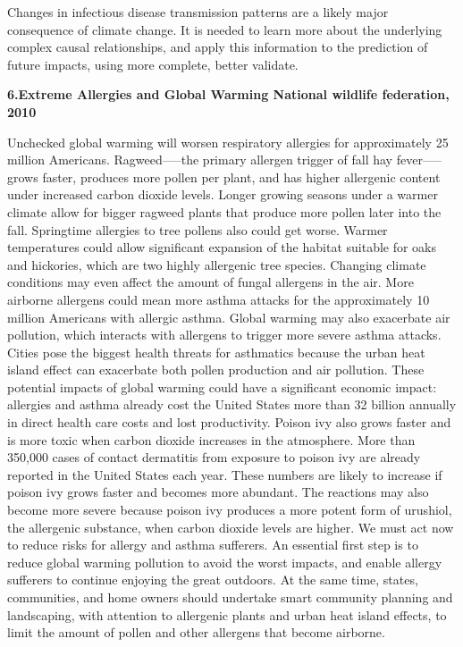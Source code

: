 \documentclass[12pt,a4paper]{report}
\begin{document}
Changes in infectious disease
transmission patterns are a likely
major consequence of climate
change. It is needed to learn more
about the underlying complex
causal relationships, and apply this
information to the prediction of
future impacts, using more
complete, better validate.

\textbf{6.Extreme Allergies and Global Warming
National wildlife federation, 2010}

Unchecked global warming will worsen respiratory allergies for
approximately 25 million Americans. Ragweed—–the primary allergen
trigger of fall hay fever—–grows faster, produces more pollen per
plant, and has higher allergenic content under increased carbon
dioxide levels. Longer growing seasons under a warmer climate allow
for bigger ragweed plants that produce more pollen later into the fall.
Springtime allergies to tree pollens also could get worse. Warmer
temperatures could allow significant expansion of the habitat
suitable for oaks and hickories, which are two highly allergenic tree
species. Changing climate conditions may even affect the amount of
fungal allergens in the air.
More airborne allergens could mean more asthma attacks for the
approximately 10 million Americans with allergic asthma. Global
warming may also exacerbate air pollution, which interacts with
allergens to trigger more severe asthma attacks. Cities pose the
biggest health threats for asthmatics because the urban heat island
effect can exacerbate both pollen production and air pollution. These
potential impacts of global warming could have a significant
economic impact: allergies and asthma already cost the United
States more than 32 billion annually in direct health care costs and
lost productivity.
Poison ivy also grows faster and is more toxic when carbon dioxide
increases in the atmosphere. More than 350,000 cases of contact
dermatitis from exposure to poison ivy are already reported in the
United States each year. These numbers are likely to increase if
poison ivy grows faster and becomes more abundant. The reactions
may also become more severe because poison ivy produces a more
potent form of urushiol, the allergenic substance, when carbon
dioxide levels are higher.
We must act now to reduce risks for allergy and asthma sufferers.
An essential first step is to reduce global warming pollution to avoid
the worst impacts, and enable allergy sufferers to continue enjoying
the great outdoors. At the same time, states, communities, and
home owners should undertake smart community planning and
landscaping, with attention to allergenic plants and urban heat island
effects, to limit the amount of pollen and other allergens that
become airborne.
\end{document}

